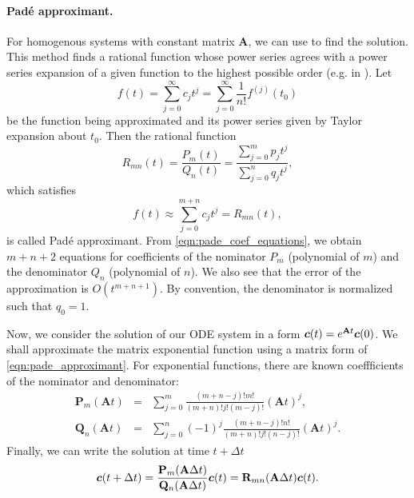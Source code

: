 \paragraph{Pad{\' e} approximant.}
For homogenous systems with constant matrix $\mathbf{A}$, we can use  
to find the solution. This method finds a rational function whose power series agrees with a power series expansion of 
a given function to the highest possible order (e.g. in \cite{press_numerical_1992}).
Let
\[
  f(t) = \sum\limits_{j=0}^{\infty} c_j t^j = \sum\limits_{j=0}^{\infty} \frac{1}{n!}f^{(j)}(t_0)
\]
be the function being approximated and its power series given by Taylor expansion about $t_0$.
Then the rational function
\begin{equation} \label{eqn:pade_approximant}
R_{mn}(t) = \frac{P_m(t)}{Q_n(t)} = \frac{\sum\limits_{j=0}^{m} p_jt^j}{\sum\limits_{j=0}^{n} q_jt^j},
\end{equation}
which satisfies 
\begin{equation} \label{eqn:pade_coef_equations}
f(t)\approx \sum\limits_{j=0}^{m+n} c_j t^j = R_{mn}(t),
\end{equation}
is called Pad{\' e} approximant. From \eqref{eqn:pade_coef_equations}, we obtain $m+n+2$ equations for
coefficients of the nominator $P_m$ (polynomial of  $m$) and 
the denominator $Q_n$ (polynomial of  $n$). We also see that the error 
of the approximation is $O(t^{m+n+1})$. By convention, the denominator is normalized such that $q_0=1$.

Now, we consider the solution of our ODE system in a form $\mathbf{\boldsymbol{c}}(t)=e^{\mathbf{A}t}\mathbf{\boldsymbol{c}}(0)$. We shall 
approximate the matrix exponential function using a matrix form of \eqref{eqn:pade_approximant}. 
For exponential functions, there are known coeffficients of the nominator and denominator:
\begin{eqnarray}
  \mathbf{P}_m(\mathbf{A}t) &=& \sum\limits^{m}_{j=0}\frac{(m+n-j)!m!}{(m+n)!j!(m-j)!} (\mathbf{A}t)^j, \\
  \mathbf{Q}_n(\mathbf{A}t) &=& \sum\limits^{n}_{j=0} (-1)^j \frac{(m+n-j)!n!}{(m+n)!j!(n-j)!} (\mathbf{A}t)^j.
\end{eqnarray}
Finally, we can write the solution at time $t+\Delta t$
\begin{equation} \label{eqn:pade_solution}
\vc{c}(t+\Delta t) = \frac{\mathbf{P}_m(\mathbf{A}\Delta t)} {\mathbf{Q}_n(\mathbf{A}\Delta t)}\vc{c}(t) 
= \mathbf{R}_{mn}(\mathbf{A}\Delta t)\vc{c}(t).
\end{equation}


